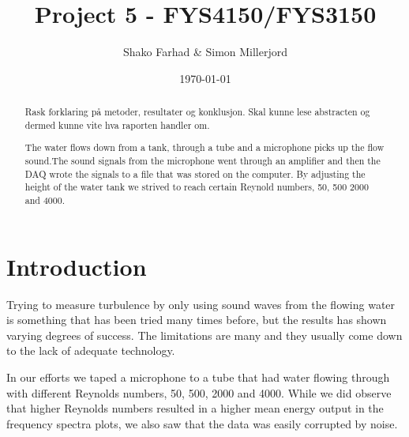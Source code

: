 \documentclass[english,a4paper,12pt]{article}
\title{Project 5 - FYS4150/FYS3150}
\author{Shako Farhad \& Simon Millerjord}
\date{\today}
\begin{document}
 
 
\lstset{style=mystyle}

\maketitle

\begin{abstract}
Rask forklaring på metoder, resultater og konklusjon. Skal kunne lese abstracten og dermed kunne vite hva raporten handler om. \bigskip

The water flows down from a tank, through a tube and a microphone picks up the flow sound.The sound signals from the microphone went through an amplifier and then the DAQ wrote the signals to a file that was stored on the computer. By adjusting the height of the water tank we strived to reach certain Reynold numbers, 50, 500 2000 and 4000.

\end{abstract}

\section*{Introduction}
Trying to measure turbulence by only using sound waves from the flowing water is something that has been tried many times before, but the results has shown varying degrees of success. The limitations are many and they usually come down to the lack of adequate technology. \bigskip 

In our efforts we taped a microphone to a tube that had water flowing through with different Reynolds numbers, 50, 500, 2000 and 4000. While we did observe that higher Reynolds numbers resulted in a higher mean energy output in the frequency spectra plots, we also saw that the data was easily corrupted by noise.
\end{document}
